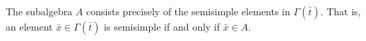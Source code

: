 The subalgebra $A$ consists precisely of the semisimple elements in $\Gamma(\bar{t})$. That is, an element $\bar{x} \in \Gamma(\bar{t})$ is semisimple if and only if $\bar{x} \in A$.
